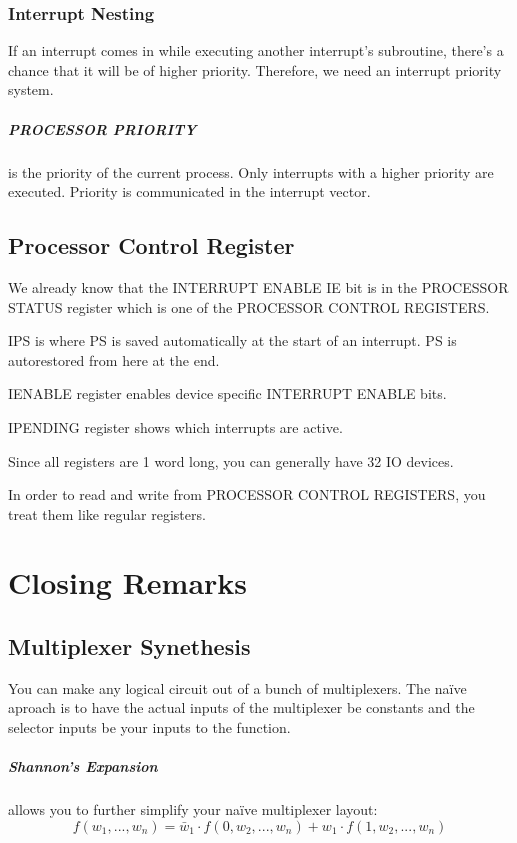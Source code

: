 \documentclass[a4paper,12pt]{report}
\begin{document}
\subsection{Interrupt Nesting}
If an interrupt comes in while executing another interrupt's subroutine, there's a chance that it will be of higher priority. Therefore, 
we need an interrupt priority system.

\paragraph{PROCESSOR PRIORITY } is the priority of the current process. Only interrupts with a higher priority are executed. Priority is
communicated in the interrupt vector. 

\section{Processor Control Register}
We already know that the INTERRUPT ENABLE IE bit is in the PROCESSOR STATUS register which is one of the PROCESSOR CONTROL REGISTERS.

IPS is where PS is saved automatically at the start of an interrupt. PS is autorestored from here at the end.

IENABLE register enables device specific INTERRUPT ENABLE bits. 

IPENDING register shows which interrupts are active. 

Since all registers are 1 word long, you can generally have 32 IO devices. 

In order to read and write from PROCESSOR CONTROL REGISTERS, you treat them like regular registers. 

\chapter{Closing Remarks}
\section{Multiplexer Synethesis}
You can make any logical circuit out of a bunch of multiplexers. The naïve aproach is to have the actual inputs of the 
multiplexer be constants and the selector inputs be your inputs to the function. 

\paragraph{Shannon's Expansion } allows you to further simplify your naïve multiplexer layout:
$$f(w_1, ... , w_n) = \bar{w}_1\cdot f(0, w_2, ..., w_n) + w_1 \cdot f(1, w_2, ..., w_n)$$
\end{document}
